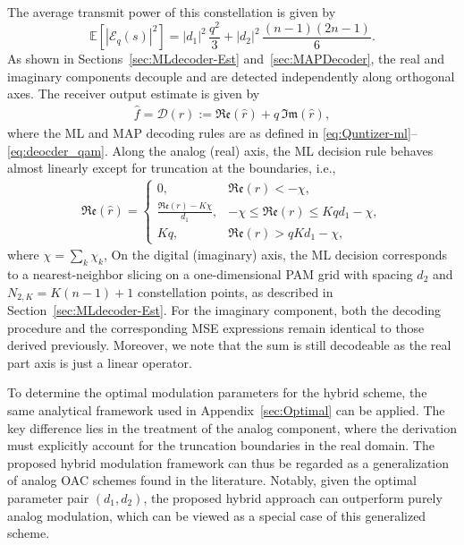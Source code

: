 \documentclass[journal,12pt,onecolumn,draftclsnofoot]{IEEEtran}
\theoremstyle{definition}
\begin{document}
The average transmit power of this constellation is given by
\begin{equation}
\label{eq:power-hybrid}
\mathbb{E}\!\left[|\mathscr{E}_q(s)|^2\right]
= |d_1|^2\,\frac{q^2}{3}
+ |d_2|^2\,\frac{(n - 1)(2n - 1)}{6}.
\end{equation}
As shown in Sections~\ref{sec:MLdecoder-Est} and~\ref{sec:MAPDecoder}, the real and imaginary components decouple and are detected independently along orthogonal axes.  The receiver output estimate is given by
\begin{align}
    \hat{f} = \mathscr{D}(r) := \mathfrak{Re}(\hat{r}) + q\,\mathfrak{Im}(\hat{r}),
\end{align}
where the ML and MAP decoding rules are as defined in \eqref{eq:Quntizer-ml}–\eqref{eq:deocder_qam}. 
Along the analog (real) axis, the ML decision rule behaves almost linearly except for truncation at the boundaries, i.e.,
\begin{align}
\mathfrak{Re}(\hat{r}) = 
\begin{cases}
0, & \mathfrak{Re}(r) < -\chi,\\
\frac{\mathfrak{Re}(r)-K\chi}{d_1} , 
& -\chi \le \mathfrak{Re}(r) \le {K q d_1}-\chi,\\
K q, & \mathfrak{Re}(r) > {q K d_1}-\chi,
\end{cases}
\end{align}
where $\chi = \sum_k\chi_k$,  On the digital (imaginary) axis, the ML decision corresponds to a nearest-neighbor slicing on a one-dimensional PAM grid with spacing \( d_2 \) and \( N_{2,K} = K(n - 1) + 1 \) constellation points, as described in Section~\ref{sec:MLdecoder-Est}.  For the imaginary component, both the decoding procedure and the corresponding MSE expressions remain identical to those derived previously. Moreover, we note that the sum is still decodeable as the real part axis is just a linear operator. 

To determine the optimal modulation parameters for the hybrid scheme, the same analytical framework used in Appendix~\ref{sec:Optimal} can be applied. 
The key difference lies in the treatment of the analog component, where the derivation must explicitly account for the truncation boundaries in the real domain. The proposed hybrid modulation framework can thus be regarded as a generalization of analog OAC schemes found in the literature.  Notably, given the optimal parameter pair \( (d_1, d_2) \), the proposed hybrid approach can outperform purely analog modulation, which can be viewed as a special case of this generalized scheme.
\end{document}
